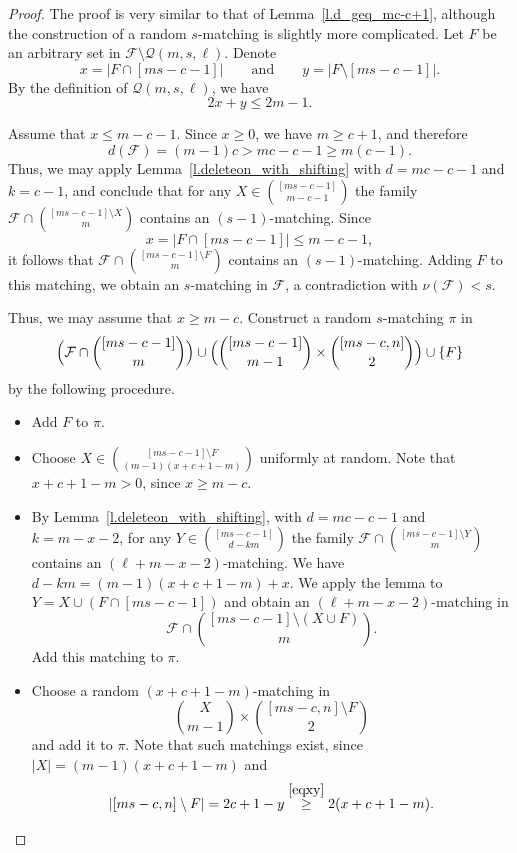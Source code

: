 \documentclass[10pt,a4paper]{amsart}
\newcommand{\m}{\mathcal}
\begin{document}
\begin{proof}
    The proof is very similar to that of Lemma~\ref{l.d_geq_mc-c+1}, although the construction of a random $s$-matching is slightly more complicated. Let $F$ be an arbitrary set in $\mathcal{F} \setminus \mathcal{Q}(m, s, \ell)$. Denote
    \[
    x = |F \cap [ms-c-1]| \qquad \text{and} \qquad y = |F \setminus [ms-c-1]|.
    \]
    By the definition of $\mathcal{Q}(m, s, \ell)$, we have \begin{equation}\label{eqxy}2x + y \leq 2m - 1.\end{equation}

    Assume that $x \leq m-c-1$. Since $x \geq 0$, we have $m \geq c + 1$, and therefore
    \[
    d(\mathcal{F}) = (m-1)c > mc-c - 1 \geq m(c-1).
    \]
    Thus, we may apply Lemma~\ref{l.deleteon_with_shifting} with $d = mc-c-1$ and $k=c-1$, and conclude that for any
    $
    X \in {[ms-c-1] \choose m-c-1}
    $
    the family $\mathcal{F}\cap {[ms-c-1]\setminus X \choose m}$ contains an $(s-1)$-matching. Since
    \[
    x = |F \cap [ms-c-1]| \leq m - c - 1,
    \]
    it follows that $\mathcal{F}\cap {[ms-c-1]\setminus F \choose m}$ contains an $(s-1)$-matching. Adding $F$ to this matching, we obtain an $s$-matching in $\mathcal{F}$, a contradiction with $\nu(\m F)<s$.

    Thus, we may assume that $x \geq m - c$. Construct a random $s$-matching $\pi$ in
    \[
    \Bigl(\mathcal{F} \cap {[ms-c-1] \choose m}\Bigr) \cup \Bigl({[ms-c-1] \choose m-1} \times {[ms-c, n] \choose 2}\Bigr) \cup \{F\}
    \]
    by the following procedure.
    \begin{itemize}
        \item Add $F$ to $\pi$.
        \item Choose
        $
        X \in {[ms-c-1] \setminus F \choose (m-1)(x+c+1-m)}
        $
        uniformly at random. Note that $x+c+1-m > 0$, since $x \geq m - c$.
        \item By Lemma~\ref{l.deleteon_with_shifting}, with $d = mc-c-1$ and $k = m-x-2$, for any
        $
        Y \in {[ms-c-1] \choose d-km}
        $
        the family $\mathcal{F} \cap {[ms-c-1] \setminus Y \choose m}$ contains an $(\ell+m-x-2)$-matching. We have $d-km=(m-1)(x+c+1-m) + x$. We apply the lemma to
        $
        Y = X \cup (F \cap [ms-c-1])
        $
        and obtain an $(\ell+m-x-2)$-matching in
        \[
        \mathcal{F} \cap {[ms-c-1] \setminus (X \cup F) \choose m}.
        \]
        Add this matching to $\pi$.
        \item Choose a random $(x+c+1-m)$-matching in
        \[
        {X \choose m-1} \times {[ms-c, n] \setminus F \choose 2}
        \]
        and add it to $\pi$. Note that such matchings exist, since $|X|=(m-1)(x+c+1-m)$ and
        \[
        |[ms-c, n] \setminus F| = 2c+1-y \overset{\eqref{eqxy}}{\geq} 2(x+c+1-m).
        \]
    \end{itemize}


\end{proof}
\end{document}
